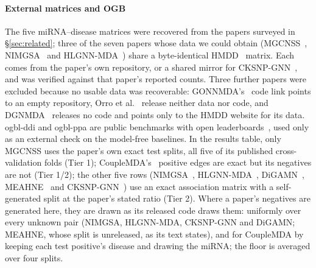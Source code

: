 \documentclass[review]{elsarticle}
\begin{document}


\paragraph{External matrices and OGB} The five miRNA--disease matrices were recovered
from the papers surveyed in \S\ref{sec:related}; three of the seven papers whose data we
could obtain (MGCNSS~\cite{tian2024mgcnss}, NIMGSA~\cite{jin2022nimgsa} and
HLGNN-MDA~\cite{yu2022hlgnnmda}) share a byte-identical HMDD~\cite{li2014hmdd} matrix. Each comes
from the paper's own repository, or a shared mirror for CKSNP-GNN~\cite{li2022cksnpgnn}, and was verified against
that paper's reported counts. Three further papers were excluded because no usable data was
recoverable: GONNMDA's~\cite{zeng2025gonnmda} code link points to an empty repository, Orro et al.~\cite{orro2026mirnadisease} release neither data nor code, and DGNMDA~\cite{lu2024dgnmda} releases no code and points only to the HMDD website for its data. ogbl-ddi and ogbl-ppa \cite{hu2020ogb} are public benchmarks with
open leaderboards~\cite{ogb2026leaderboard}, used only as an external check on the model-free baselines. In the
results table, only MGCNSS uses the paper's own exact test splits, all five of its published cross-validation folds (Tier 1); CoupleMDA's~\cite{li2025couplemda}
positive edges are exact but its negatives are not (Tier 1/2); the other five rows (NIMGSA~\cite{jin2022nimgsa}, HLGNN-MDA~\cite{yu2022hlgnnmda}, DiGAMN~\cite{liu2024digamn}, MEAHNE~\cite{huang2022meahne} and CKSNP-GNN~\cite{li2022cksnpgnn}) use
an exact association matrix with a self-generated split at the paper's stated ratio (Tier 2). Where a paper's
negatives are generated here, they are drawn as its released code draws them: uniformly over every unknown pair
(NIMGSA, HLGNN-MDA, CKSNP-GNN and DiGAMN; MEAHNE, whose split is unreleased, as its text states), and for
CoupleMDA by keeping each test positive's disease and drawing the miRNA; the floor is averaged over four splits.
\end{document}
